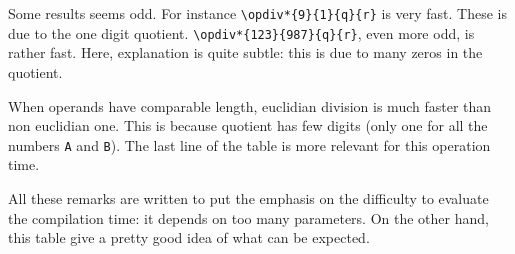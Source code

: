 \documentclass[12pt]{report}
\begin{document}
Some results seems odd. For instance \verb+\opdiv*{9}{1}{q}{r}+ is
very fast. These is due to the one digit quotient.
\verb+\opdiv*{123}{987}{q}{r}+, even more odd, is rather fast. Here,
explanation is quite subtle: this is due to many zeros in the
quotient.

When operands have comparable length, euclidian division is much
faster than non euclidian one. This is because quotient has few
digits (only one for all the numbers \texttt{A} and \texttt{B}). The
last line of the table is more relevant for this operation time.

All these remarks are written to put the emphasis on the difficulty to
evaluate the compilation time: it depends on too many parameters. On
the other hand, this table give a pretty good idea of what can be
expected.
%

\newpage
\end{document}
